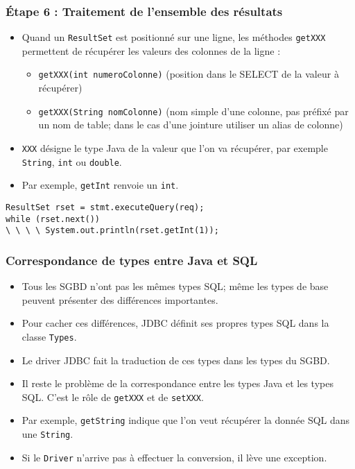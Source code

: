 \documentclass[xcolor=pdftex,x11names,table]{beamer}
\begin{document}
    \begin{frame}
    \frametitle{Étape 6 : Traitement de l’ensemble des résultats}
    	\begin{itemize}
    		\item Quand un \lstinline$ResultSet$ est positionné sur une ligne, les méthodes \lstinline$getXXX$ permettent de récupérer
				les valeurs des colonnes de la ligne :
				    	\begin{itemize}
    						\item \lstinline$getXXX(int numeroColonne)$ (position dans le SELECT de la valeur à récupérer)
    						\item \lstinline$getXXX(String nomColonne)$ (nom simple d’une colonne, pas préfixé par un nom de table; dans le cas d’une jointure utiliser un alias de colonne)
							\end{itemize}
				\item \lstinline$XXX$ désigne le type Java de la valeur que l'on va récupérer, par exemple \lstinline$String$, \lstinline$int$ ou \lstinline$double$.
				\item Par exemple, \lstinline$getInt$ renvoie un \lstinline$int$.
			\end{itemize}\pause
			\begin{block}{}
				\lstinline$ResultSet rset = stmt.executeQuery(req);$\\
				\lstinline$while (rset.next())$\\
				\lstinline$\ \ \ \ System.out.println(rset.getInt(1));$\\
      \end{block}
    \end{frame}
    \begin{frame}
    \frametitle{Correspondance de types entre Java et SQL}
    	\begin{itemize}
    		\item Tous les SGBD n’ont pas les mêmes types SQL; 
    		même les types de base peuvent présenter des différences importantes.
				\item Pour cacher ces différences, JDBC définit ses propres types SQL 
				dans la classe \lstinline$Types$.
				\item Le driver JDBC fait la traduction de ces types dans les types du SGBD.
				\item Il reste le problème de la correspondance entre les types Java et les types SQL.
				C'est le rôle de \lstinline$getXXX$ et de \lstinline$setXXX$. 
				\item Par exemple, \lstinline$getString$ indique que l’on veut récupérer la donnée SQL dans une \lstinline$String$.
				\item Si le \lstinline$Driver$ n'arrive pas à effectuer la conversion, il lève une exception.
    	\end{itemize}
    \end{frame}
\end{document}
